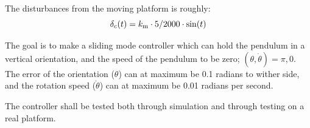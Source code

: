 The disturbances from the moving platform is roughly:
\begin{equation}
        \delta_c(t) = k_{\mathrm{m}} \cdot 5/2000 \cdot \sin(t)
\end{equation}

The goal is to make a sliding mode controller which can hold the pendulum in a vertical orientation, and the speed of the pendulum to be zero; $(\theta, \dot{\theta})= \pi, 0$. The error of the orientation ($\theta$) can at maximum be 0.1 radians to wither side, and the rotation speed ($\dot{\theta}$) can at maximum be 0.01 radians per second.

The controller shall be tested both through simulation and through testing on a real platform.
